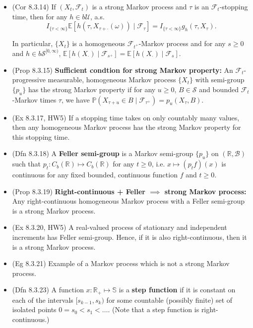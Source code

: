 \documentclass[twoside]{article}
\newcommand\bbE{\mathbb{E}}
\newcommand\bbP{\mathbb{P}}
\newcommand\bbR{\mathbb{R}}
\newcommand\bbS{\mathbb{S}}
\newcommand\calB{\mathcal{B}}
\newcommand\calF{\mathcal{F}}
\newcommand\calS{\mathcal{S}}
\newcommand\calU{\mathcal{U}}
\newcommand\om{\omega}
\begin{document}
\begin{itemize}
\item (Cor 8.3.14) If $(X_t, \calF_t)$ is a strong Markov process and $\tau$ is an $\calF_t$-stopping time, then for any $h \in b\calU$, a.s.
\[ I_{\{\tau < \infty\}} \bbE [h(\tau, X_{\tau + \cdot}(\om)) \mid \calF_{\tau}] = I_{\{\tau < \infty\}} g_h(\tau, X_\tau). \]

In particular, $\{X_t\}$ is a homogeneous $\calF_{t^+}$-Markov process and for any $s \geq 0$ and $h \in b\calS^{[0, \infty)}$, $\bbE [h(X_\cdot) \mid \calF_{s^+}] = \bbE [h(X_\cdot) \mid \calF_s]$.

\item (Prop 8.3.15) \textbf{Sufficient condtion for strong Markov property:} An $\calF_t$-progressive measurable, homogeneous Markov process $\{ X_t\}$ with semi-group $\{p_u \}$ has the strong Markov property if for any $u \geq 0$, $B \in \calS$ and bounded $\calF_t$-Markov times $\tau$, we have $\bbP(X_{\tau + u} \in B \mid \calF_{\tau^+}) = p_u(X_\tau, B)$.

\item (Ex 8.3.17, HW5) If a stopping time takes on only countably many values, then any homogeneous Markov process has the strong Markov property for this stopping time.

\item (Dfn 8.3.18) A \textbf{Feller semi-group} is a Markov semi-group $\{p_u\}$ on $(\bbR, \calB)$ such that $p_t: C_b(\bbR) \mapsto C_b(\bbR)$ for any $t \geq 0$, i.e. $x \mapsto (p_tf)(x)$ is continuous for any fixed bounded, continuous function $f$ and $t \geq 0$.

\item (Prop 8.3.19) \textbf{Right-continuous + Feller $\implies$ strong Markov process:} Any right-continuous homogeneous Markov process with a Feller semi-group is a strong Markov process.

\item (Ex 8.3.20, HW5) A real-valued process of stationary and independent increments has Feller semi-group. Hence, if it is also right-continuous, then it is a strong Markov process.

\item (Eg 8.3.21) Example of a Markov process which is not a strong Markov process.

\item (Dfn 8.3.23) A function $x: \bbR_+ \mapsto \bbS$ is a \textbf{step function} if it is constant on each of the intervals $[s_{k-1}, s_k)$ for some countable (possibly finite) set of isolated points $0 = s_0 < s_1 < \dots$. (Note that a step function is right-continuous.)


\end{itemize}
\end{document}
